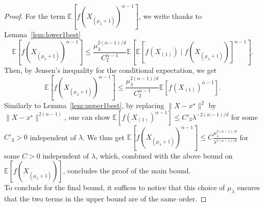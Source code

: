 \begin{proof}
For the term $\mathbb{E}\left[f(X_{(\mu_{\lambda}+1)})^{\alpha-1}\right]$,
we write thanks to Lemma~\ref{lem:lower1best}
\[
\mathbb{E}\left[f(X_{(\mu_{\lambda}+1)})^{\alpha-1}\right]\leq\frac{\mu_{\lambda}^{2(\alpha-1)/d}}{C_{2}^{\alpha-1}}\mathbb{E}\left[\mathbb{E}\left[f(X_{(1)})\mid f(X_{(\mu_{\lambda}+1)})\right]^{\alpha-1}\right].
\]
Then, by Jensen's inequality for the conditional expectation, we get
\[
\mathbb{E}\left[f(X_{(\mu_{\lambda}+1)})^{\alpha-1}\right]\le\frac{\mu_{\lambda}^{2(\alpha-1)/d}}{C_{2}^{\alpha-1}}\mathbb{E}\left[f(X_{(1)})^{\alpha-1}\right].
\]
Similarly to Lemma~\ref{lem:upper1best}, by replacing $\lVert X-x^\star\rVert^2$ by $\lVert X-x^\star\rVert^{2(\alpha-1)}$, one can show $\mathbb{E}\left[f(X_{(1)})^{\alpha-1}\right]\le C'_{3}\lambda^{-2(\alpha-1)/d}$
for some $C'_{3}>0$ independent of $\lambda$. We thus get $\mathbb{E}\left[f(X_{(\mu_{\lambda}+1)})^{\alpha-1}\right]\le C\frac{\mu_{\lambda}^{2(\alpha-1)/d}}{\lambda^{2(\alpha-1)/d}}$
for some $C>0$ independent of $\lambda$, which, combined with the
above bound on $\mathbb{E}\left[f(X_{(\mu_{\lambda}+1)})\right]$,
concludes the proof of the main bound.\\ To conclude for the final bound, it suffices to notice that this choice of $\mu_{\lambda}$ ensures that the two terms in the upper bound are of the same order.\end{proof}

